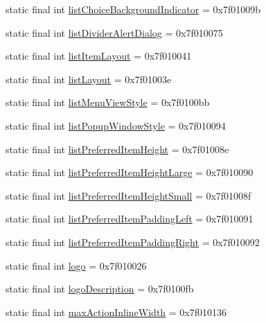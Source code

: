 \begin{CompactItemize}
\item 
static final int \hyperlink{classandroid_1_1support_1_1coreutils_1_1_r_1_1attr_2fd1182360c2ef7e5141dbdba4ca3787}{listChoiceBackgroundIndicator} = 0x7f01009b
\item 
static final int \hyperlink{classandroid_1_1support_1_1coreutils_1_1_r_1_1attr_6209d30642e513df5c5d2fd3c6c60069}{listDividerAlertDialog} = 0x7f010075
\item 
static final int \hyperlink{classandroid_1_1support_1_1coreutils_1_1_r_1_1attr_0cd03f853cf094e22e59cbb4e3db9ab5}{listItemLayout} = 0x7f010041
\item 
static final int \hyperlink{classandroid_1_1support_1_1coreutils_1_1_r_1_1attr_747dbdd2f3c2bf105e65c4a1e636e207}{listLayout} = 0x7f01003e
\item 
static final int \hyperlink{classandroid_1_1support_1_1coreutils_1_1_r_1_1attr_58d34e13ad53b4a2ca4c16ce5cc19644}{listMenuViewStyle} = 0x7f0100bb
\item 
static final int \hyperlink{classandroid_1_1support_1_1coreutils_1_1_r_1_1attr_4730c57033e903da9d16ba64f8d0acbf}{listPopupWindowStyle} = 0x7f010094
\item 
static final int \hyperlink{classandroid_1_1support_1_1coreutils_1_1_r_1_1attr_95e50876d6ddce173e2abf8286e5dc82}{listPreferredItemHeight} = 0x7f01008e
\item 
static final int \hyperlink{classandroid_1_1support_1_1coreutils_1_1_r_1_1attr_41278817267eb5b22028a2c55e9ebd03}{listPreferredItemHeightLarge} = 0x7f010090
\item 
static final int \hyperlink{classandroid_1_1support_1_1coreutils_1_1_r_1_1attr_9a8b734e2208dde3eec100d36e402cdf}{listPreferredItemHeightSmall} = 0x7f01008f
\item 
static final int \hyperlink{classandroid_1_1support_1_1coreutils_1_1_r_1_1attr_bba7b4f83740c6a281fb7e6aa52d17e2}{listPreferredItemPaddingLeft} = 0x7f010091
\item 
static final int \hyperlink{classandroid_1_1support_1_1coreutils_1_1_r_1_1attr_5089c61d6f3adf5d06d49e97cacab0b2}{listPreferredItemPaddingRight} = 0x7f010092
\item 
static final int \hyperlink{classandroid_1_1support_1_1coreutils_1_1_r_1_1attr_a245cd9aff7e13a30bcf14f57881e74a}{logo} = 0x7f010026
\item 
static final int \hyperlink{classandroid_1_1support_1_1coreutils_1_1_r_1_1attr_567e5f691fe8518a4e1664c044927155}{logoDescription} = 0x7f0100fb
\item 
static final int \hyperlink{classandroid_1_1support_1_1coreutils_1_1_r_1_1attr_c85b763d6ffba65e183f55d61f4f6b25}{maxActionInlineWidth} = 0x7f010136

\end{CompactItemize}
